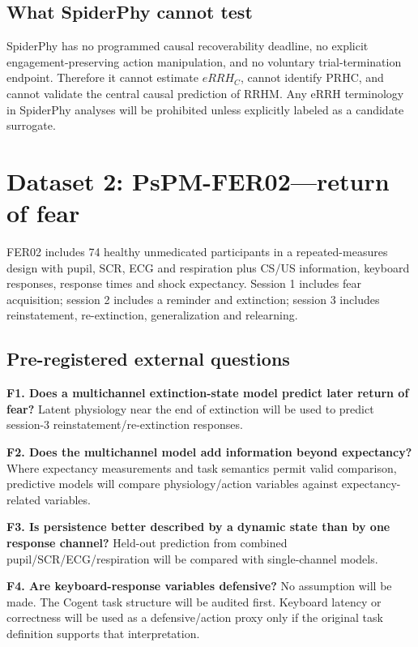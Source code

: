 \documentclass[11pt]{article}
\begin{document}
\subsection{What SpiderPhy cannot test}

SpiderPhy has no programmed causal recoverability deadline, no explicit engagement-preserving action manipulation, and no voluntary trial-termination endpoint. Therefore it cannot estimate $eRRH_C$, cannot identify PRHC, and cannot validate the central causal prediction of RRHM. Any eRRH terminology in SpiderPhy analyses will be prohibited unless explicitly labeled as a candidate surrogate.

\section{Dataset 2: PsPM-FER02---return of fear}

FER02 includes 74 healthy unmedicated participants in a repeated-measures design with pupil, SCR, ECG and respiration plus CS/US information, keyboard responses, response times and shock expectancy. Session 1 includes fear acquisition; session 2 includes a reminder and extinction; session 3 includes reinstatement, re-extinction, generalization and relearning.

\subsection{Pre-registered external questions}

\textbf{F1. Does a multichannel extinction-state model predict later return of fear?} Latent physiology near the end of extinction will be used to predict session-3 reinstatement/re-extinction responses.

\textbf{F2. Does the multichannel model add information beyond expectancy?} Where expectancy measurements and task semantics permit valid comparison, predictive models will compare physiology/action variables against expectancy-related variables.

\textbf{F3. Is persistence better described by a dynamic state than by one response channel?} Held-out prediction from combined pupil/SCR/ECG/respiration will be compared with single-channel models.

\textbf{F4. Are keyboard-response variables defensive?} No assumption will be made. The Cogent task structure will be audited first. Keyboard latency or correctness will be used as a defensive/action proxy only if the original task definition supports that interpretation.
\end{document}
